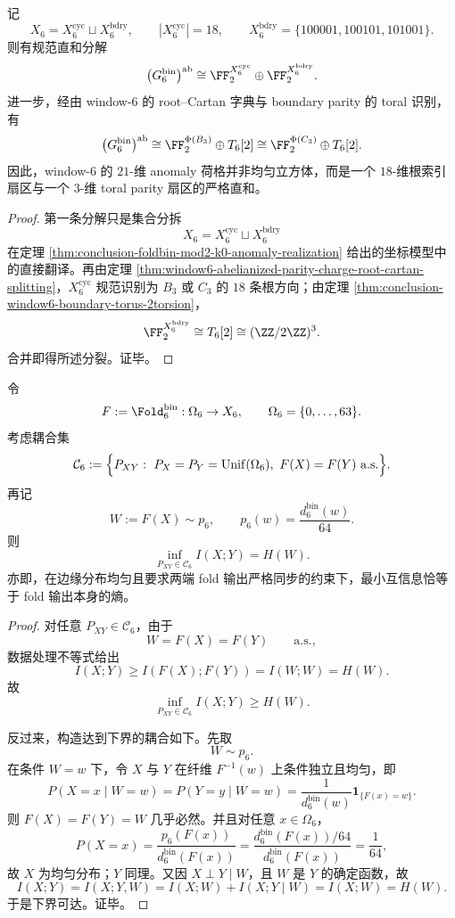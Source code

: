 \begin{corollary}\label{cor:conclusion-window6-anomaly-root-torus-mod2-splitting}
记
\[
X_6=X_6^{\mathrm{cyc}}\sqcup X_6^{\mathrm{bdry}},
\qquad
|X_6^{\mathrm{cyc}}|=18,
\qquad
X_6^{\mathrm{bdry}}=\{100001,100101,101001\}.
\]
则有规范直和分解
\[
\bigl(G_6^{\mathrm{bin}}\bigr)^{\mathrm{ab}}
\cong
\FF_2^{X_6^{\mathrm{cyc}}}\oplus \FF_2^{X_6^{\mathrm{bdry}}}.
\]
进一步，经由 window-\(6\) 的 root--Cartan 字典与 boundary parity 的 toral 识别，有
\[
\bigl(G_6^{\mathrm{bin}}\bigr)^{\mathrm{ab}}
\cong
\FF_2^{\Phi(B_3)}\oplus T_6[2]
\cong
\FF_2^{\Phi(C_3)}\oplus T_6[2].
\]
因此，window-\(6\) 的 \(21\)-维 anomaly 荷格并非均匀立方体，而是一个 \(18\)-维根索引扇区与一个 \(3\)-维 toral parity 扇区的严格直和。
\end{corollary}
\begin{proof}
第一条分解只是集合分拆
\[
X_6=X_6^{\mathrm{cyc}}\sqcup X_6^{\mathrm{bdry}}
\]
在定理 \ref{thm:conclusion-foldbin-mod2-k0-anomaly-realization} 给出的坐标模型中的直接翻译。再由定理 \ref{thm:window6-abelianized-parity-charge-root-cartan-splitting}，\(X_6^{\mathrm{cyc}}\) 规范识别为 \(B_3\) 或 \(C_3\) 的 \(18\) 条根方向；由定理 \ref{thm:conclusion-window6-boundary-torus-2torsion}，
\[
\FF_2^{X_6^{\mathrm{bdry}}}
\cong
T_6[2]\cong (\ZZ/2\ZZ)^3.
\]
合并即得所述分裂。证毕。
\end{proof}

\begin{theorem}\label{thm:conclusion-window6-exact-fold-synchronization-mutual-information}
令
\[
F:=\Fold_6^{\mathrm{bin}}:\Omega_6\to X_6,
\qquad
\Omega_6=\{0,\dots,63\}.
\]
考虑耦合集
\[
\mathcal C_6
:=
\Bigl\{
P_{XY}:\ P_X=P_Y=\mathrm{Unif}(\Omega_6),\ F(X)=F(Y)\ \text{a.s.}
\Bigr\}.
\]
再记
\[
W:=F(X)\sim p_6,
\qquad
p_6(w)=\frac{d_6^{\mathrm{bin}}(w)}{64}.
\]
则
\[
\inf_{P_{XY}\in\mathcal C_6} I(X;Y)=H(W).
\]
亦即，在边缘分布均匀且要求两端 fold 输出严格同步的约束下，最小互信息恰等于 fold 输出本身的熵。
\end{theorem}
\begin{proof}
对任意 \(P_{XY}\in\mathcal C_6\)，由于
\[
W=F(X)=F(Y)\qquad\text{a.s.},
\]
数据处理不等式给出
\[
I(X;Y)\ge I(F(X);F(Y))=I(W;W)=H(W).
\]
故
\[
\inf_{P_{XY}\in\mathcal C_6} I(X;Y)\ge H(W).
\]

反过来，构造达到下界的耦合如下。先取
\[
W\sim p_6.
\]
在条件 \(W=w\) 下，令 \(X\) 与 \(Y\) 在纤维 \(F^{-1}(w)\) 上条件独立且均匀，即
\[
P(X=x\mid W=w)=P(Y=y\mid W=w)=\frac{1}{d_6^{\mathrm{bin}}(w)}\mathbf 1_{\{F(x)=w\}}.
\]
则 \(F(X)=F(Y)=W\) 几乎必然。并且对任意 \(x\in\Omega_6\)，
\[
P(X=x)
=
\frac{p_6(F(x))}{d_6^{\mathrm{bin}}(F(x))}
=
\frac{d_6^{\mathrm{bin}}(F(x))/64}{d_6^{\mathrm{bin}}(F(x))}
=
\frac{1}{64},
\]
故 \(X\) 为均匀分布；\(Y\) 同理。又因 \(X\perp Y\mid W\)，且 \(W\) 是 \(Y\) 的确定函数，故
\[
I(X;Y)=I(X;Y,W)=I(X;W)+I(X;Y\mid W)=I(X;W)=H(W).
\]
于是下界可达。证毕。
\end{proof}

